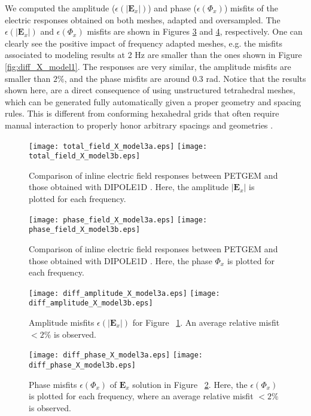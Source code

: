 \documentclass[review]{elsarticle}
\begin{document}
We computed the amplitude ($\epsilon(|\mathbf{E}_x|)$) and phase ($\epsilon(\Phi_{x})$) misfits of the electric responses obtained on both meshes, adapted and oversampled. The $\epsilon(|\mathbf{E}_x|)$ and $\epsilon(\Phi_{x})$ misfits are shown in Figures \ref{fig:diff_amplitude_X_model3} and \ref{fig:diff_phase_X_model3}, respectively. One can clearly see the positive impact of frequency adapted meshes, e.g. the misfits associated to modeling results at 2 Hz are smaller than the ones shown in Figure \ref{fig:diff_X_model1}. The responses are very similar, the amplitude misfits are smaller than $2\%$, and the phase misfits are around $0.3$ rad. Notice that the results shown here, are a direct consequence of using unstructured tetrahedral meshes, which can be generated fully automatically given a proper geometry and spacing rules. This is different from conforming hexahedral grids that often require manual interaction to properly honor arbitrary spacings and geometries \citep{Owen1998}.
\begin{figure}[!htbp]
	\centering
	\texttt{[image: total\_field\_X\_model3a.eps]}
	\texttt{[image: total\_field\_X\_model3b.eps]}
	\caption{Comparison of inline electric field responses between PETGEM and those obtained with DIPOLE1D \citep{Key2009}. Here, the amplitude $|\mathbf{E}_{x}|$ is plotted for each frequency.}
	\label{fig:total_field_X_model3}
\end{figure}
\begin{figure}[!htbp]
	\centering
	\texttt{[image: phase\_field\_X\_model3a.eps]}
	\texttt{[image: phase\_field\_X\_model3b.eps]}
	\caption{Comparison of inline electric field responses between PETGEM and those obtained with DIPOLE1D \citep{Key2009}. Here, the phase $\Phi_{x}$ is plotted for each frequency.}
	\label{fig:phase_field_X_model3}
\end{figure}
\begin{figure}[!htbp]
	\centering
	\texttt{[image: diff\_amplitude\_X\_model3a.eps]}
	\texttt{[image: diff\_amplitude\_X\_model3b.eps]}
	\caption{Amplitude misfits $\epsilon(|\mathbf{E}_{x}|)$ for Figure ~\ref{fig:total_field_X_model3}. An average relative misfit $<2\%$ is observed.}
	\label{fig:diff_amplitude_X_model3}
\end{figure}
\begin{figure}[!htbp]
	\centering
	\texttt{[image: diff\_phase\_X\_model3a.eps]}
	\texttt{[image: diff\_phase\_X\_model3b.eps]}
	\caption{Phase misfits $\epsilon(\Phi_{x})$ of $\mathbf{E}_{x}$ solution in Figure ~\ref{fig:phase_field_X_model3}. Here, the $\epsilon(\Phi_{x})$ is plotted for each frequency, where an average relative misfit $<2\%$ is observed.}	
	\label{fig:diff_phase_X_model3}
\end{figure}
\end{document}

